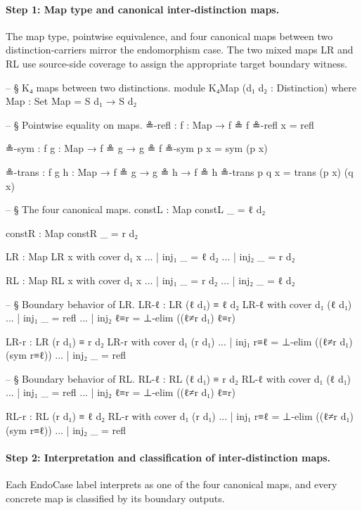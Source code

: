 \documentclass[11pt,a4paper]{book}
\def\texttt#1{#1}%
\begin{document}
\paragraph{Step 1: Map type and canonical inter-distinction maps.}
The map type, pointwise equivalence, and four canonical maps between two distinction-carriers mirror the endomorphism case.
The two mixed maps \texttt{LR} and \texttt{RL} use source-side coverage to assign the appropriate target boundary witness.

\begin{code}
-- § K₄ maps between two distinctions.
module K₄Map (d₁ d₂ : Distinction) where
  Map : Set
  Map = S d₁ → S d₂

  -- § Pointwise equality on maps.
  ≗-refl : {f : Map} → f ≗ f
  ≗-refl x = refl

  ≗-sym : {f g : Map} → f ≗ g → g ≗ f
  ≗-sym p x = sym (p x)

  ≗-trans : {f g h : Map} → f ≗ g → g ≗ h → f ≗ h
  ≗-trans p q x = trans (p x) (q x)

  -- § The four canonical maps.
  constL : Map
  constL _ = ℓ d₂

  constR : Map
  constR _ = r d₂

  LR : Map
  LR x with cover d₁ x
  ... | inj₁ _ = ℓ d₂
  ... | inj₂ _ = r d₂

  RL : Map
  RL x with cover d₁ x
  ... | inj₁ _ = r d₂
  ... | inj₂ _ = ℓ d₂

  -- § Boundary behavior of LR.
  LR-ℓ : LR (ℓ d₁) ≡ ℓ d₂
  LR-ℓ with cover d₁ (ℓ d₁)
  ... | inj₁ _   = refl
  ... | inj₂ ℓ≡r = ⊥-elim ((ℓ≠r d₁) ℓ≡r)

  LR-r : LR (r d₁) ≡ r d₂
  LR-r with cover d₁ (r d₁)
  ... | inj₁ r≡ℓ = ⊥-elim ((ℓ≠r d₁) (sym r≡ℓ))
  ... | inj₂ _   = refl

  -- § Boundary behavior of RL.
  RL-ℓ : RL (ℓ d₁) ≡ r d₂
  RL-ℓ with cover d₁ (ℓ d₁)
  ... | inj₁ _   = refl
  ... | inj₂ ℓ≡r = ⊥-elim ((ℓ≠r d₁) ℓ≡r)

  RL-r : RL (r d₁) ≡ ℓ d₂
  RL-r with cover d₁ (r d₁)
  ... | inj₁ r≡ℓ = ⊥-elim ((ℓ≠r d₁) (sym r≡ℓ))
  ... | inj₂ _   = refl
\end{code}

\paragraph{Step 2: Interpretation and classification of inter-distinction maps.}
Each \texttt{EndoCase} label interprets as one of the four canonical maps, and every concrete map is classified by its boundary outputs.
\end{document}

